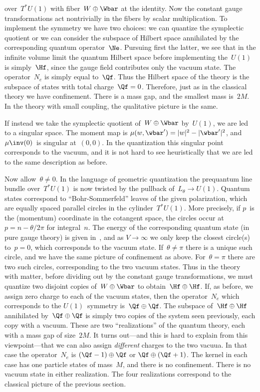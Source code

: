 over~$T^*U(1)$ with fiber~$W\oplus \Wbar$ at the identity.  Now the constant
gauge transformations act nontrivially in the fibers by scalar
multiplication.  To implement the symmetry we have two choices: we can
quantize the symplectic quotient or we can consider the subspace of Hilbert
space annihilated by the corresponding quantum operator~$\Ne$.  Pursuing
first the latter, we see that in the infinite volume limit the quantum
Hilbert space before implementing the~$U(1)$ is simply~$\Hf$, since the gauge
field contributes only the vacuum state.  The operator~$N_e$ is simply equal
to~$\Qf$.  Thus the Hilbert space of the theory is the subspace of states
with total charge~$\Qf=0$.  Therefore, just as in the classical theory we
have confinement.  There is a mass gap, and the smallest mass is~$2M$.  In
the theory with small coupling, the qualitative picture is the same.
 
If instead we take the symplectic quotient of~$W\oplus \Wbar$ by~$U(1)$, we
are led to a singular space.  The moment map is $\mu (w,\wbar') = |w|^2 -
|\wbar'|^2$, and $\mu \inv (0)$~is singular at~$(0,0)$.  In the quantization
this singular point corresponds to the vacuum, and it is not hard to see
heuristically that we are led to the same description as before. 
 
Now allow~$\theta \not= 0$.  In the language of geometric quantization the
prequantum line bundle over~$T^*U(1)$ is now twisted by the pullback
of~$L_\theta \to U(1)$.  Quantum states correspond to ``Bohr-Sommerfeld''
leaves of the given polarization, which are equally spaced parallel circles
in the cylinder~$T^*U(1)$.  More precisely, if $p$~is the (momentum)
coordinate in the cotangent space, the circles occur at $p=n-\theta /2\pi $
for integral~$n$.  The energy of the corresponding quantum state (in pure
gauge theory) is given in~, and as $V\to\infty $ we only keep the
closest circle(s) to~$p=0$, which corresponds to the vacuum state.
If~$\theta \not= \pi $ there is a unique such circle, and we have the same
picture of confinement as above.  For~$\theta =\pi $ there are two such
circles, corresponding to the two vacuum states.  Thus in the theory with
matter, before dividing out by the constant gauge transformations, we must
quantize two disjoint copies of~$W\oplus \Wbar$ to obtain~$\Hf\oplus \Hf$.
If, as before, we assign zero charge to each of the vacuum states, then the
operator~$N_e$ which corresponds to the $U(1)$~symmetry is~$\Qf\oplus \Qf$.
The subspace of~$\Hf\oplus \Hf$ annihilated by~$\Qf\oplus \Qf$ is simply two
copies of the system seen previously, each copy with a vacuum.  These are two
``realizations'' of the quantum theory, each with a mass gap of size~$2M$.
It turns out---and this is hard to explain from this viewpoint---that we can
also assign {\it different\/} charges to the two vacuua.  In that case the
operator~$N_e$ is $(\Qf-1)\oplus \Qf$ or $\Qf\oplus (\Qf+1)$.  The kernel in
each case has one particle states of mass~$M$, and there is no confinement.
There is no vacuum state in either realization.  The four realizations
correspond to the classical picture of the previous section.


